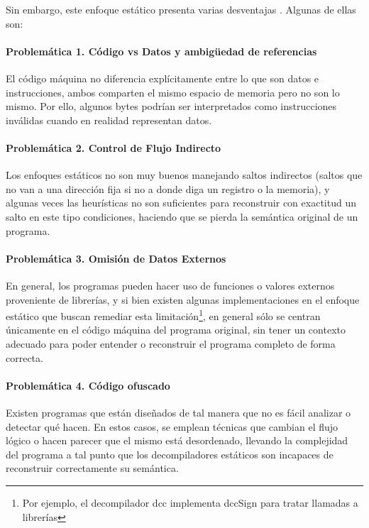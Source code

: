 \documentclass[runningheads]{llncs}
\begin{document}
Sin embargo, este enfoque estático presenta varias desventajas \cite{binrec}. Algunas de ellas son:

\paragraph{Problemática 1. Código vs Datos y ambigüedad de referencias} El código máquina no diferencia 
explícitamente entre lo que son datos e instrucciones, ambos comparten el mismo espacio de memoria 
pero no son lo mismo. Por ello, algunos bytes podrían ser interpretados como instrucciones inválidas 
cuando en realidad representan datos.

\paragraph{Problemática 2. Control de Flujo Indirecto} Los enfoques estáticos no son muy buenos 
manejando saltos indirectos (saltos que no van a una dirección fija si no a donde diga un registro 
o la memoria), y algunas veces las heurísticas no son suficientes para reconstruir con exactitud 
un salto en este tipo condiciones, haciendo que se pierda la semántica original de un programa.

\paragraph{Problemática 3. Omisión de Datos Externos} En general, los programas pueden hacer uso de
funciones o valores externos proveniente de librerías, y si bien existen algunas implementaciones 
en el enfoque estático que buscan remediar esta limitación\footnote{Por ejemplo, el decompilador dcc 
implementa dccSign para tratar llamadas a librerías}, en general sólo se centran únicamente en el código 
máquina del programa original, sin tener un contexto adecuado para poder entender o reconstruir el 
programa completo de forma correcta.

\paragraph{Problemática 4. Código ofuscado} Existen programas que están diseñados de tal manera que 
no es fácil analizar o detectar qué hacen. En estos casos, se emplean técnicas que cambian el flujo 
lógico o hacen parecer que el mismo está desordenado, llevando la complejidad del programa a tal 
punto que los decompiladores estáticos son incapaces de reconstruir correctamente su semántica.\newline
\end{document}
